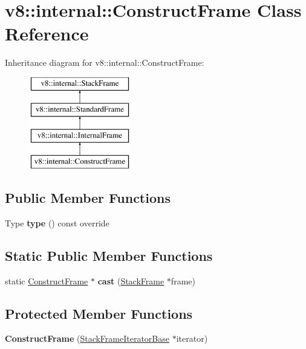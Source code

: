 \hypertarget{classv8_1_1internal_1_1ConstructFrame}{}\section{v8\+:\+:internal\+:\+:Construct\+Frame Class Reference}
\label{classv8_1_1internal_1_1ConstructFrame}
Inheritance diagram for v8\+:\+:internal\+:\+:Construct\+Frame\+:\begin{figure}[H]
\begin{center}
\leavevmode
\includegraphics[height=4.000000cm]{classv8_1_1internal_1_1ConstructFrame}
\end{center}
\end{figure}
\subsection*{Public Member Functions}
\begin{DoxyCompactItemize}
\item 
\mbox{\label{classv8_1_1internal_1_1ConstructFrame_a35e6f014dad4652a4bbef774e768d937}} 
Type {\bfseries type} () const override
\end{DoxyCompactItemize}
\subsection*{Static Public Member Functions}
\begin{DoxyCompactItemize}
\item 
\mbox{\label{classv8_1_1internal_1_1ConstructFrame_a605f22c838c4e877e620d070898d219c}} 
static \mbox{\hyperlink{classv8_1_1internal_1_1ConstructFrame}{Construct\+Frame}} $\ast$ {\bfseries cast} (\mbox{\hyperlink{classv8_1_1internal_1_1StackFrame}{Stack\+Frame}} $\ast$frame)
\end{DoxyCompactItemize}
\subsection*{Protected Member Functions}
\begin{DoxyCompactItemize}
\item 
\mbox{\label{classv8_1_1internal_1_1ConstructFrame_ac4c5d9185272361659321552533290c2}} 
{\bfseries Construct\+Frame} (\mbox{\hyperlink{classv8_1_1internal_1_1StackFrameIteratorBase}{Stack\+Frame\+Iterator\+Base}} $\ast$iterator)
\end{DoxyCompactItemize}
